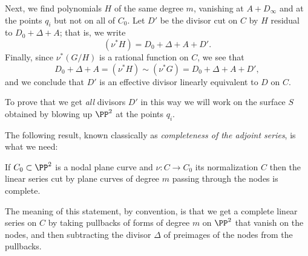Next, we find polynomials $H$ of the same degree $m$, vanishing at $A+D_\infty$ and at the points $q_i$  but not on all of $C_0$. Let $D'$ be the divisor cut on $C$ by $H$ residual to $D_0 + \Delta + A$; that is, we write
$$
(\nu^*H) = D_0 + \Delta + A + D'.
$$
Finally, since $\nu^*(G/H)$ is a rational function on $C$, we see that 
$$
D_0 + \Delta + A = (\nu^*H) \sim (\nu^*G) = D_0 + \Delta + A + D',
$$
and we conclude that $D'$ is an effective divisor linearly equivalent to $D$ on $C$.

To prove that we get \emph{all} divisors $D'$ in this way we will work on the surface $S$ obtained by blowing up
$\PP^2$ at the points $q_i$. 

The following result, known classically as \emph{completeness of the adjoint series}, is what we need:

\begin{proposition}\label{adjoint completeness}
If $C_0 \subset \PP^2$ is a nodal plane curve and $\nu : C \to C_0$ its normalization $C$ then the linear series cut by plane curves of degree $m$ passing through the nodes is complete.
\end{proposition}

The  meaning of this statement, by convention, is that we get a complete linear series on $C$ by taking pullbacks of forms of degree $m$ on $\PP^2$
that vanish on the nodes, and then subtracting the divisor $\Delta$ of preimages of the nodes from the pullbacks.

